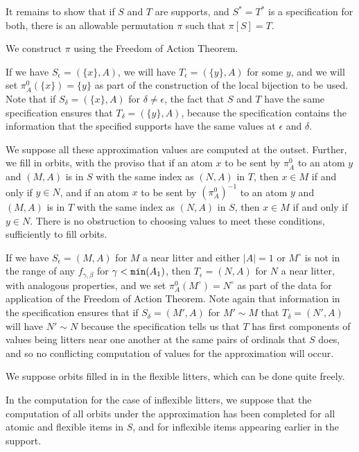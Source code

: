 \documentclass[112pt]{article}
\begin{document}
\begin{description}
It remains to show that if $S$ and $T$ are supports, and $S^*=T^*$ is a specification for both, there is an allowable permutation $\pi$ such that $\pi[S]=T$.  

We construct $\pi$ using the Freedom of Action Theorem.

If we have $S_\epsilon = (\{x\},A)$, we will have $T_\epsilon = (\{y\},A)$ for some $y$, and we will set $\pi^0_A(\{x\}) = \{y\}$ as part of the construction of the local bijection to be used.     Note that if $S_\delta = (\{x\},A)$ for $\delta \neq \epsilon$, the fact that $S$ and
$T$ have the same specification ensures that $T_\delta = (\{y\},A)$, because the specification contains the information that the specified supports have the same values at $\epsilon$ and $\delta$.

We suppose all these approximation values are computed at the outset.  Further, we fill in orbits,
with the proviso that if an atom $x$  to be sent by $\pi^0_A$ to an atom $y$ and $(M,A)$ is in $S$ with the same index as $(N,A)$ in $T$, then $x \in M$ if and only if $y \in N$,   and if an atom $x$  to be sent by $(\pi^0_A)^{-1}$ to an atom $y$ and $(M,A)$ is in $T$ with the same index as $(N,A)$ in $S$, then $x \in M$ if and only if $y \in N$.  There is no obstruction to choosing values to meet these conditions, sufficiently to fill orbits.

If we have $S_\epsilon = (M,A)$ for $M$ a near litter and either $|A|=1$ or $M^\circ$ is not in the range of any $f_{\gamma,\beta}$ for $\gamma<{\tt min}(A_1)$, then $T_\epsilon = (N,A)$ for $N$ a near litter, with analogous properties, and we set $\pi^0_A(M^\circ) = N^\circ$  as part of the data for application of the Freedom of Action Theorem.    Note again
that information in the specification ensures that if $S_\delta = (M',A)$  for $M'\sim M$ that
$T_\delta = (N',A)$ will have $N' \sim N$ because the specification tells us that $T$ has first components of values being litters near one another at the same pairs of ordinals that $S$ does,
and so no conflicting computation of values for the approximation will occur.

We suppose orbits filled in in the flexible litters, which can be done quite freely.

In the computation for the case of inflexible litters, we suppose that the computation of all orbits under the approximation has been completed for all atomic and flexible items in $S$, and for inflexible items appearing earlier in the support.


\end{description}
\end{document}
